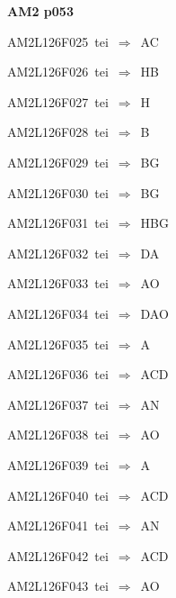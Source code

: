 \par\vfill\eject
{\bf\hfill AM2 p053\hfill\hbox{}}\par\bigskip
{\sixrm AM2L126F025\ {\sixit tei}\ }$\Rightarrow$\ AC\par\smallskip
{\sixrm AM2L126F026\ {\sixit tei}\ }$\Rightarrow$\ HB\par\smallskip
{\sixrm AM2L126F027\ {\sixit tei}\ }$\Rightarrow$\ H\par\smallskip
{\sixrm AM2L126F028\ {\sixit tei}\ }$\Rightarrow$\ B\par\smallskip
{\sixrm AM2L126F029\ {\sixit tei}\ }$\Rightarrow$\ BG\par\smallskip
{\sixrm AM2L126F030\ {\sixit tei}\ }$\Rightarrow$\ BG\par\smallskip
{\sixrm AM2L126F031\ {\sixit tei}\ }$\Rightarrow$\ HBG\par\smallskip
{\sixrm AM2L126F032\ {\sixit tei}\ }$\Rightarrow$\ DA\par\smallskip
{\sixrm AM2L126F033\ {\sixit tei}\ }$\Rightarrow$\ AO\par\smallskip
{\sixrm AM2L126F034\ {\sixit tei}\ }$\Rightarrow$\ DAO\par\smallskip
{\sixrm AM2L126F035\ {\sixit tei}\ }$\Rightarrow$\ A\par\smallskip
{\sixrm AM2L126F036\ {\sixit tei}\ }$\Rightarrow$\ ACD\par\smallskip
{\sixrm AM2L126F037\ {\sixit tei}\ }$\Rightarrow$\ AN\par\smallskip
{\sixrm AM2L126F038\ {\sixit tei}\ }$\Rightarrow$\ AO\par\smallskip
{\sixrm AM2L126F039\ {\sixit tei}\ }$\Rightarrow$\ A\par\smallskip
{\sixrm AM2L126F040\ {\sixit tei}\ }$\Rightarrow$\ ACD\par\smallskip
{\sixrm AM2L126F041\ {\sixit tei}\ }$\Rightarrow$\ AN\par\smallskip
{\sixrm AM2L126F042\ {\sixit tei}\ }$\Rightarrow$\ ACD\par\smallskip
{\sixrm AM2L126F043\ {\sixit tei}\ }$\Rightarrow$\ AO\par\smallskip

